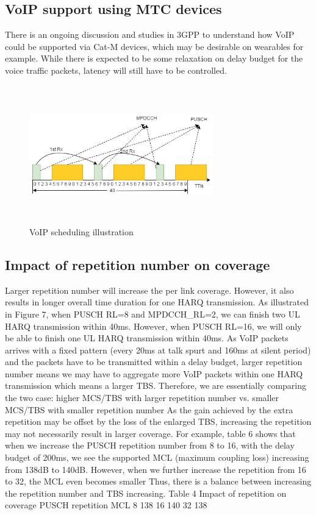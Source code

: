 \documentclass[conference,compsoc]{IEEEtran}
\begin{document}
\subsection{VoIP support using MTC devices}
There is an ongoing discussion and studies in 3GPP to understand how VoIP could be supported via Cat-M devices, which may be desirable on wearables for example. While there is expected to be some relaxation on delay budget for the voice traffic packets, latency will still have to be controlled.

\begin{figure}[htbp]
\centerline{\includegraphics[height=60mm,width=80mm]{voip.png}}
\caption{VoIP scheduling illustration}
\label{fig_voip}
\end{figure}


\subsection{Impact of repetition number on coverage}
Larger repetition number will increase the per link coverage. However, it also results in longer overall time duration for one HARQ transmission. As illustrated in Figure 7, when PUSCH RL=8 and MPDCCH\_RL=2, we can finish two UL HARQ transmission within 40ms. However, when PUSCH RL=16, we will only be able to finish one UL HARQ transmission within 40ms. As VoIP packets arrives with a fixed pattern (every 20ms at talk spurt and 160ms at silent period) and the packets have to be transmitted within a delay budget, larger repetition number means we may have to aggregate more VoIP packets within one HARQ transmission which means a larger TBS. Therefore, we are essentially comparing the two case: higher MCS/TBS with larger repetition number vs. smaller MCS/TBS with smaller repetition number As the gain achieved by the extra repetition may be offset by the loss of the enlarged TBS, increasing the repetition may not necessarily result in larger coverage. For example, table 6 shows that when we increase the PUSCH repetition number from 8 to 16, with the delay budget of 200ms, we see the supported MCL (maximum coupling loss) increasing from 138dB to 140dB. However, when we further increase the repetition from 16 to 32, the MCL even becomes smaller   Thus, there is a balance between increasing the repetition number and TBS increasing.
Table 4 Impact of repetition on coverage
PUSCH repetition	MCL
8	138
16	140
32	138
\end{document}
